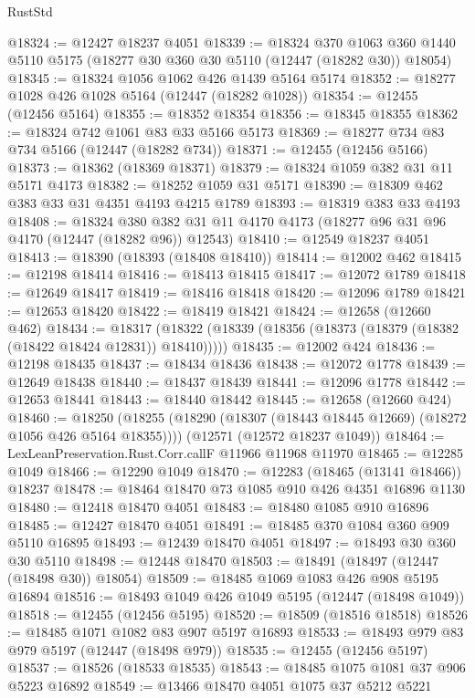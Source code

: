\begin{lexlean}{RustStd}
\begin{coremodule}
@18324 := @12427 @18237 @4051
@18339 := @18324
    @370
    @1063
    @360
    @1440
    @5110
    @5175
    (@18277 @30 @360 @30 @5110 (@12447 (@18282 @30)) @18054)
@18345 := @18324 @1056 @1062 @426 @1439 @5164 @5174
@18352 := @18277 @1028 @426 @1028 @5164 (@12447 (@18282 @1028))
@18354 := @12455 (@12456 @5164)
@18355 := @18352 @18354
@18356 := @18345 @18355
@18362 := @18324 @742 @1061 @83 @33 @5166 @5173
@18369 := @18277 @734 @83 @734 @5166 (@12447 (@18282 @734))
@18371 := @12455 (@12456 @5166)
@18373 := @18362 (@18369 @18371)
@18379 := @18324 @1059 @382 @31 @11 @5171 @4173
@18382 := @18252 @1059 @31 @5171
@18390 := @18309 @462 @383 @33 @31 @4351 @4193 @4215 @1789
@18393 := @18319 @383 @33 @4193
@18408 := @18324
    @380
    @382
    @31
    @11
    @4170
    @4173
    (@18277 @96 @31 @96 @4170 (@12447 (@18282 @96)) @12543)
@18410 := @12549 @18237 @4051
@18413 := @18390 (@18393 (@18408 @18410))
@18414 := @12002 @462
@18415 := @12198 @18414
@18416 := @18413 @18415
@18417 := @12072 @1789
@18418 := @12649 @18417
@18419 := @18416 @18418
@18420 := @12096 @1789
@18421 := @12653 @18420
@18422 := @18419 @18421
@18424 := @12658 (@12660 @462)
@18434 := @18317 (@18322 (@18339 (@18356 (@18373 (@18379 (@18382 (@18422 @18424 @12831)) @18410)))))
@18435 := @12002 @424
@18436 := @12198 @18435
@18437 := @18434 @18436
@18438 := @12072 @1778
@18439 := @12649 @18438
@18440 := @18437 @18439
@18441 := @12096 @1778
@18442 := @12653 @18441
@18443 := @18440 @18442
@18445 := @12658 (@12660 @424)
@18460 := @18250
    (@18255 (@18290 (@18307 (@18443 @18445 @12669) (@18272 @1056 @426 @5164 @18355))))
    (@12571 (@12572 @18237 @1049))
@18464 := LexLeanPreservation.Rust.Corr.callF @11966 @11968 @11970
@18465 := @12285 @1049
@18466 := @12290 @1049
@18470 := @12283 (@18465 (@13141 @18466)) @18237
@18478 := @18464 @18470 @73 @1085 @910 @426 @4351 @16896 @1130
@18480 := @12418 @18470 @4051
@18483 := @18480 @1085 @910 @16896
@18485 := @12427 @18470 @4051
@18491 := @18485 @370 @1084 @360 @909 @5110 @16895
@18493 := @12439 @18470 @4051
@18497 := @18493 @30 @360 @30 @5110
@18498 := @12448 @18470
@18503 := @18491 (@18497 (@12447 (@18498 @30)) @18054)
@18509 := @18485 @1069 @1083 @426 @908 @5195 @16894
@18516 := @18493 @1049 @426 @1049 @5195 (@12447 (@18498 @1049))
@18518 := @12455 (@12456 @5195)
@18520 := @18509 (@18516 @18518)
@18526 := @18485 @1071 @1082 @83 @907 @5197 @16893
@18533 := @18493 @979 @83 @979 @5197 (@12447 (@18498 @979))
@18535 := @12455 (@12456 @5197)
@18537 := @18526 (@18533 @18535)
@18543 := @18485 @1075 @1081 @37 @906 @5223 @16892
@18549 := @13466 @18470 @4051 @1075 @37 @5212 @5221

\end{coremodule}
\end{lexlean}
